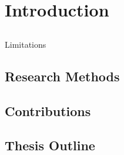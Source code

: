 \chapter{Introduction}\label{introduction}




\section{}{Limitations}
\section{Research Methods}
\section{Contributions}
\section{Thesis Outline}

